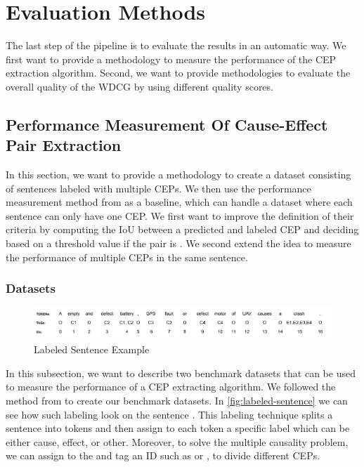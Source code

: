 \chapter{Evaluation Methods}\label{ch:evaluation-methods}
The last step of the pipeline is to evaluate the results in an automatic way.
We first want to provide a methodology to measure the performance of the \ac{CEP} extraction algorithm.
Second, we want to provide methodologies to evaluate the overall quality of the \ac{WDCG} by using different quality scores.


\section{Performance Measurement Of Cause-Effect Pair Extraction}\label{sec:measure-the-performance-of-the-cause-effect}
In this section, we want to provide a methodology to create a dataset consisting of sentences labeled with multiple \ac{CEP}s.
We then use the performance measurement method from \cite{pawar2021knowledge} as a baseline, which can handle a dataset where each sentence can only have one \ac{CEP}.
We first want to improve the definition of their  criteria by computing the \ac{IoU} between a predicted and labeled \ac{CEP} and deciding based on a threshold value if the pair is .
We second extend the idea to measure the performance of multiple \ac{CEP}s in the same sentence.

\subsection{Datasets}\label{subsec:datasets}
\begin{figure}
    \includegraphics[width=\textwidth]{figures/evaluation_methods/labled_dataset}
    \caption{Labeled Sentence Example}\label{fig:labeled-sentence}
\end{figure}
In this subsection, we want to describe two benchmark datasets that can be used to measure the performance of a \ac{CEP} extracting algorithm.
We followed the  method from \cite{xu2020review} to create our benchmark datasets.
In \autoref{fig:labeled-sentence} we can see how such labeling look on the sentence .
This labeling technique splits a sentence into tokens and then assign to each token a specific label which can be either  cause,  effect, or  other.
Moreover, to solve the multiple causality problem, we can assign to the  and  tag an ID such as  or , to divide different \ac{CEP}s.

